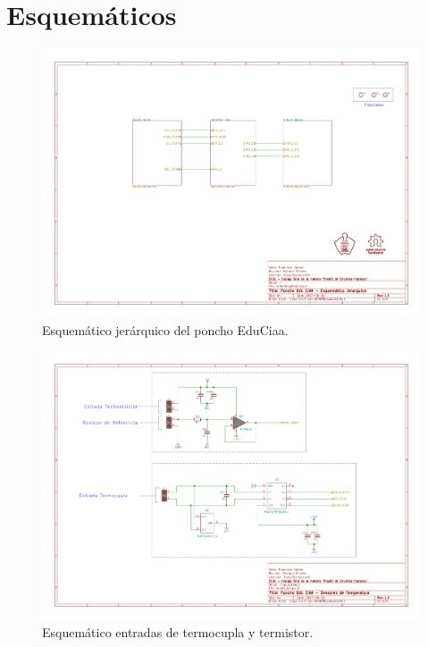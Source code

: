 
\chapter{Esquemáticos} %

\label{AppendixB} %

\begin{figure}[h!]
	\centering
	\includegraphics[width=1\textwidth]{Figures/sch_mainPoncho}
	\caption{Esquemático jerárquico del poncho EduCiaa.}
	\label{fig:schMainPoncho}
\end{figure}


\begin{figure}[h!]
	\centering
	\includegraphics[width=1\textwidth]{Figures/sch_inpTempTerm}
	\caption{Esquemático entradas de termocupla y termistor.}
	\label{fig:schEntradas}
\end{figure}


